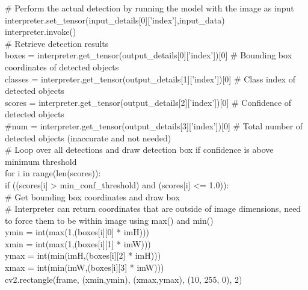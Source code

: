     \# Perform the actual detection by running the model with the image as input\\
    interpreter.set\_tensor(input\_details[0]['index'],input\_data)\\
    interpreter.invoke()\\

    \# Retrieve detection results\\
    boxes = interpreter.get\_tensor(output\_details[0]['index'])[0] \# Bounding box coordinates of detected objects\\
    classes = interpreter.get\_tensor(output\_details[1]['index'])[0] \# Class index of detected objects\\
    scores = interpreter.get\_tensor(output\_details[2]['index'])[0] \# Confidence of detected objects\\
    \#num = interpreter.get\_tensor(output\_details[3]['index'])[0]  \# Total number of detected objects (inaccurate and not needed)\\

    \# Loop over all detections and draw detection box if confidence is above minimum threshold\\
    for i in range(len(scores)):\\
        if ((scores[i] > min\_conf\_threshold) and (scores[i] <= 1.0)):\\

            \# Get bounding box coordinates and draw box\\
            \# Interpreter can return coordinates that are outside of image dimensions, need to force them to be within image using max() and min()\\
            ymin = int(max(1,(boxes[i][0] * imH)))\\
            xmin = int(max(1,(boxes[i][1] * imW)))\\
            ymax = int(min(imH,(boxes[i][2] * imH)))\\
            xmax = int(min(imW,(boxes[i][3] * imW)))\\
            
            cv2.rectangle(frame, (xmin,ymin), (xmax,ymax), (10, 255, 0), 2)\\

